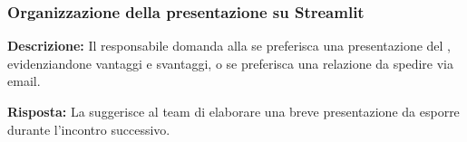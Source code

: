 \subsubsection{Organizzazione della presentazione su Streamlit}

\textbf{Descrizione:} Il responsabile domanda alla  se preferisca una presentazione del  , evidenziandone vantaggi e svantaggi, o se preferisca una relazione da spedire via email.

\textbf{Risposta:} La  suggerisce al team di elaborare una breve presentazione da esporre durante l'incontro successivo.
